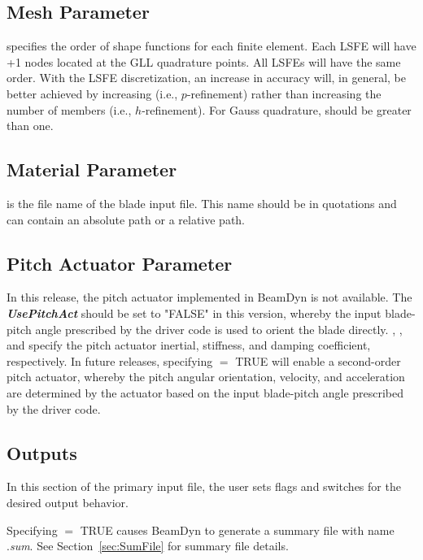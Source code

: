 \subsection{Mesh Parameter}

 specifies the order of shape functions for each finite element.  
Each LSFE will have +1 nodes located at the GLL quadrature points.
All LSFEs will have the same order.
With the LSFE discretization, an increase in accuracy will, in general, be better achieved by increasing  (i.e., $p$-refinement) rather than increasing the number of members (i.e., $h$-refinement).
For Gauss quadrature,  should be greater than one. 

\subsection{Material Parameter}

 is the file name of the blade input file. 
This name should be in quotations and can contain an absolute path or a relative path.

\subsection{Pitch Actuator Parameter}

In this release, the pitch actuator implemented in BeamDyn is not available. 
The \textbf{\textit{UsePitchAct}} should be set to "FALSE" in this version, whereby the input blade-pitch angle prescribed by the driver code is used to orient the blade directly. 
, , and  specify the pitch actuator inertial, stiffness, and damping coefficient, respectively. 
In future releases, specifying  $=$ TRUE will enable a second-order pitch actuator, whereby the pitch angular orientation, velocity, and acceleration are determined by the actuator based on the input blade-pitch angle prescribed by the driver code.

\subsection{Outputs}

In this section of the primary input file, the user sets flags and switches for the desired output behavior.

Specifying  $=$ TRUE causes BeamDyn to generate a summary file with name .\textit{sum}. 
See Section~\ref{sec:SumFile} for summary file details.

